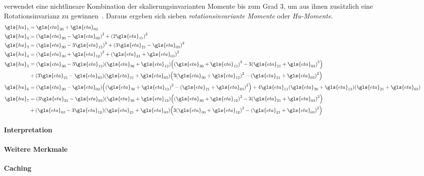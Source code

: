 \citeauthor{Hu} verwendet eine nichtlineare Kombination der skalierungsinvarianten Momente bis zum Grad $3$, um aus ihnen zusätzlich eine Rotationsinvarianz zu gewinnen~\cite{Hu, momente}.
Daraus ergeben sich sieben \emph{rotationsinvariante Momente} oder \emph{Hu-Momente}.
\begin{equation*}
\begin{split}
  \gls{hu}_1 & = \gls{eta}_{20} + \gls{eta}_{02}\\
  \gls{hu}_2 & = {\left(\gls{eta}_{20} - \gls{eta}_{02}\right)}^2 + {\left(2\gls{eta}_{11}\right)}^2\\
  \gls{hu}_3 & = {\left(\gls{eta}_{30} - 3\gls{eta}_{12}\right)}^2 + {\left(3\gls{eta}_{21} - \gls{eta}_{03}\right)}^2\\
  \gls{hu}_4 & = {\left(\gls{eta}_{30} + \gls{eta}_{12}\right)}^2 + {\left(\gls{eta}_{21} + \gls{eta}_{03}\right)}^2\\
  \gls{hu}_5 & = \left(\gls{eta}_{30} - 3\gls{eta}_{12}\right)\left(\gls{eta}_{30} + \gls{eta}_{12}\right) \left({\left(\gls{eta}_{30} + \gls{eta}_{12}\right)}^2 - 3{\left(\gls{eta}_{21} + \gls{eta}_{03}\right)}^2\right)\\
  & + \left(3\gls{eta}_{21} - \gls{eta}_{03}\right)\left(\gls{eta}_{21} + \gls{eta}_{03}\right) \left(3{\left(\gls{eta}_{30} + \gls{eta}_{12}\right)}^2 - {\left(\gls{eta}_{21} + \gls{eta}_{03}\right)}^2\right)\\
  \gls{hu}_6 & = \left(\gls{eta}_{20} - \gls{eta}_{02}\right)\left({\left(\gls{eta}_{30} + \gls{eta}_{12}\right)}^2 - {\left(\gls{eta}_{21} + \gls{eta}_{03}\right)}^2\right) + 4\gls{eta}_{11}\left(\gls{eta}_{30} + \gls{eta}_{12}\right)\left(\gls{eta}_{21} + \gls{eta}_{03}\right)\\
  \gls{hu}_7 & = \left(3\gls{eta}_{21} - \gls{eta}_{03}\right)\left(\gls{eta}_{30} + \gls{eta}_{12}\right) \left({\left(\gls{eta}_{30} + \gls{eta}_{12}\right)}^2 - 3{\left(\gls{eta}_{21} + \gls{eta}_{03}\right)}^2\right)\\
  & + \left(\gls{eta}_{03} - 3\gls{eta}_{12}\right)\left(\gls{eta}_{21} + \gls{eta}_{03}\right) \left(3{\left(\gls{eta}_{30} + \gls{eta}_{12}\right)}^2 - {\left(\gls{eta}_{21} + \gls{eta}_{03}\right)}^2\right)
\end{split}
\end{equation*}

\paragraph{Interpretation}
\label{interpretation_momente}


\paragraph{Weitere Merkmale}
\label{weitere_merkmale}

\paragraph{Caching}
\label{Caching}



\cite{Siedhoff}
